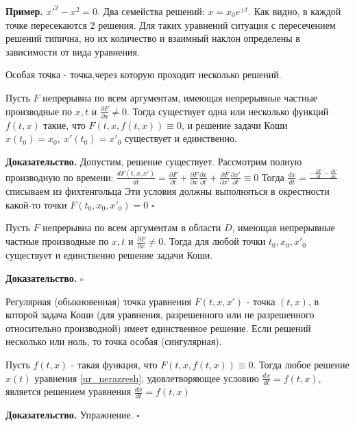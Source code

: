 \textbf{Пример.} $x'^2-x^2=0$. Два семейства решений:
$x=x_0e^{\pm t}$. Как видно, в каждой точке пересекаются 2 решения. 
Для таких уравнений  ситуация с пересечением решений 
типична, но их количество и взаимный наклон определены в зависимости от вида
уравнения.
\begin{defin}
Особая точка - точка,через которую проходит несколько решений.
\end{defin}
\begin{theor}
Пусть $F$ непрерывна по всем аргументам, имеющая непрерывные частные 
производные по  $x,t$ и  $\frac{\partial F}{\partial x}\ne 0$. Тогда
существует одна или несколько функций $f(t,x)$ такие, что 
$F(t,x,f(t,x))\equiv0$, и решение задачи Коши $x(t_0)=x_0,~x'(t_0)=x'_0$
существует и единственно. 
\end{theor}
\textbf{Доказательство.}  
Допустим, решение существует.
Рассмотрим полную производную по времени: 
$\frac{dF(t,x,x')}{dt}=\frac{\partial F}{\partial t}+
 \frac{\partial F}{\partial x}\frac{\partial x}{\partial t} +
 \frac{\partial F}{\partial x'}\frac{\partial x'}{\partial t}\equiv 0$
Тогда $\frac{dx}{dt}=\frac{-\frac{\partial F}{\partial t} -
\frac{\partial V}{\partial x} }{}$ списываем из фихтенгольца
Эти условия должны выполняться в окрестности какой-то точки
$F(t_0,x_0,x'_0)=0$ $\square$ \\
\begin{theor}
Пусть $F$ непрерывна по всем аргументам в области $D$,
имеющая непрерывные частные 
производные по  $x,t$ и  $\frac{\partial F}{\partial x}\ne 0$. Тогда
для любой точки $t_0,x_0,x'_0$ существует и единственно решение задачи Коши. 
\end{theor}
\textbf{Доказательство.}  
$\square$ \\
\begin{defin}
Регулярная (обыкновенная) точка уравнения $F(t,x,x')$ - точка $(t,x)$, 
в которой задача Коши (для уравнения, разрешенного или не разрешенного 
относительно производной) имеет единственное решение. Если решений несколько
или ноль, то точка особая (сингулярная).
\end{defin}

\begin{theor}
Пусть $f(t,x)$ - такая функция, что  $F(t,x,f(t,x))\equiv 0$. Тогда
любое решение $x(t)$ уравнения \ref{ur_nerazresh}, удовлетворяющее 
условию $\frac{dx}{dt}=f(t,x)$, является решением 
уравнения  $ \frac{dx}{dt}=f(t,x)$
\end{theor}
\textbf{Доказательство.}  Упражнение. 
$\square$ \\


